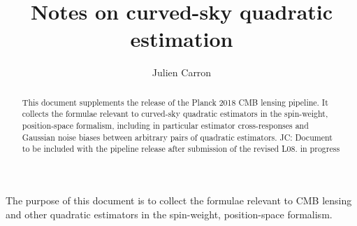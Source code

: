\documentclass[reprint,prd, superscriptaddress, tightenlines, longbibliography, nofootinbib, eqsecnum, amsfonts, amsmath, floatfix, notitlepage, twocolumn]{revtex4-1}
\newcommand{\JC}[1]{\color{red}JC: #1\color{black}}
\begin{document}
\title{Notes on curved-sky quadratic estimation}
\begin{abstract}This document supplements the release of the Planck 2018 CMB lensing \cite{Aghanim:2018oex} pipeline. It collects the formulae relevant to curved-sky quadratic estimators in the spin-weight, position-space formalism, including in particular estimator cross-responses and Gaussian noise biases between arbitrary pairs of quadratic estimators. \JC{Document to be included with the pipeline release after submission of the revised L08. in progress}

\end{abstract}	
\author{Julien Carron}

\maketitle
\tableofcontents

\vspace{1cm}

The purpose of this document is to collect the formulae relevant to CMB lensing and other quadratic estimators in the spin-weight, position-space formalism. 
\end{document}
